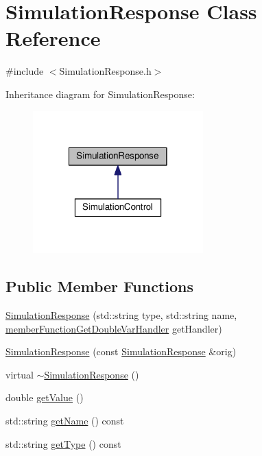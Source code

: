 \hypertarget{class_simulation_response}{\section{Simulation\-Response Class Reference}
\label{class_simulation_response}
}


{\ttfamily \#include $<$Simulation\-Response.\-h$>$}



Inheritance diagram for Simulation\-Response\-:\nopagebreak
\begin{figure}[H]
\begin{center}
\leavevmode
\includegraphics[width=186pt]{class_simulation_response__inherit__graph}
\end{center}
\end{figure}
\subsection*{Public Member Functions}
\begin{DoxyCompactItemize}
\item 
\hyperlink{class_simulation_response_ac1e30f0ae4469ce18df3261e7d4c4781}{Simulation\-Response} (std\-::string type, std\-::string name, \hyperlink{_on_event_manager_8h_aa97195a0d80442c68665a1267e6ea97b}{member\-Function\-Get\-Double\-Var\-Handler} get\-Handler)
\item 
\hyperlink{class_simulation_response_aaa3a1bdb3a9a330eea2264fdeaa2bdb2}{Simulation\-Response} (const \hyperlink{class_simulation_response}{Simulation\-Response} \&orig)
\item 
virtual \hyperlink{class_simulation_response_acca988782297cd916b8a8532368fc94d}{$\sim$\-Simulation\-Response} ()
\item 
double \hyperlink{class_simulation_response_a192c1e10f0ecd3e6f6a06990bc73c07a}{get\-Value} ()
\item 
std\-::string \hyperlink{class_simulation_response_a2f1db747e9dfd4d641d761b6cf23af9b}{get\-Name} () const 
\item 
std\-::string \hyperlink{class_simulation_response_a3fd37c35a74ec17b651eea2e145ecf4f}{get\-Type} () const 
\end{DoxyCompactItemize}
